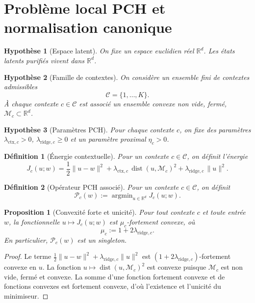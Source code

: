 \documentclass[11pt,a4paper]{article}
\newtheorem{definition}{Définition}[section]
\newtheorem{assumption}{Hypothèse}[section]
\newtheorem{proposition}{Proposition}[section]
\DeclareMathOperator{\argmin}{argmin}
\DeclareMathOperator{\dist}{dist}
\newcommand{\R}{\mathbb R}
\newcommand{\Mcal}{\mathcal M}
\newcommand{\Ccal}{\mathcal C}
\newcommand{\Pcal}{\mathcal P}
\begin{document}
\section{Problème local PCH et normalisation canonique}

\begin{assumption}[Espace latent]
On fixe un espace euclidien réel \(\R^d\). Les états latents purifiés vivent dans \(\R^d\).
\end{assumption}

\begin{assumption}[Famille de contextes]
On considère un ensemble fini de contextes admissibles
\[
\Ccal=\{1,\dots,K\}.
\]
À chaque contexte \(c\in\Ccal\) est associé un ensemble convexe non vide, fermé, \(\Mcal_c\subset\R^d\).
\end{assumption}

\begin{assumption}[Paramètres PCH]
Pour chaque contexte \(c\), on fixe des paramètres \(\lambda_{\mathrm{ctx},c}>0\), \(\lambda_{\mathrm{ridge},c}\ge 0\) et un paramètre proximal \(\eta_c>0\).
\end{assumption}

\begin{definition}[Énergie contextuelle]
Pour un contexte \(c\in\Ccal\), on définit l'énergie
\[
J_c(u;w)=\frac12\|u-w\|^2+\lambda_{\mathrm{ctx},c}\,\dist(u,\Mcal_c)^2+\lambda_{\mathrm{ridge},c}\,\|u\|^2.
\]
\end{definition}

\begin{definition}[Opérateur PCH associé]
Pour un contexte \(c\in\Ccal\), on définit
\[
\Pcal_c(w):=\argmin_{u\in\R^d} J_c(u;w).
\]
\end{definition}

\begin{proposition}[Convexité forte et unicité]
Pour tout contexte \(c\) et toute entrée \(w\), la fonctionnelle \(u\mapsto J_c(u;w)\) est \(\mu_c\)-fortement convexe, où
\[
\mu_c:=1+2\lambda_{\mathrm{ridge},c}.
\]
En particulier, \(\Pcal_c(w)\) est un singleton.
\end{proposition}

\begin{proof}
Le terme \(\frac12\|u-w\|^2+\lambda_{\mathrm{ridge},c}\|u\|^2\) est \((1+2\lambda_{\mathrm{ridge},c})\)-fortement convexe en \(u\). La fonction \(u\mapsto \dist(u,\Mcal_c)^2\) est convexe puisque \(\Mcal_c\) est non vide, fermé et convexe. La somme d'une fonction fortement convexe et de fonctions convexes est fortement convexe, d'où l'existence et l'unicité du minimiseur.
\end{proof}
\end{document}
